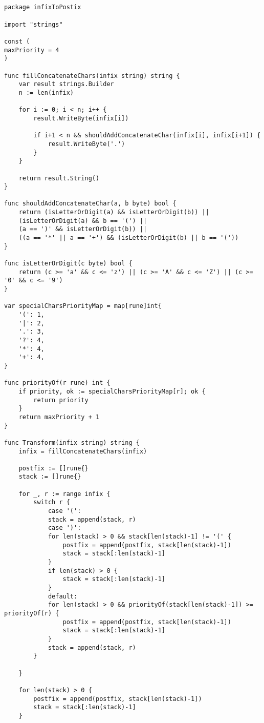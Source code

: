 \begin{appendices}
	\chapter{}\label{app1}
	\begin{lstlisting}[caption=Модуль infixToPostfix, extendedchars=\true]
package infixToPostix

import "strings"

const (
maxPriority = 4
)

func fillConcatenateChars(infix string) string {
	var result strings.Builder
	n := len(infix)
	
	for i := 0; i < n; i++ {
		result.WriteByte(infix[i])
		
		if i+1 < n && shouldAddConcatenateChar(infix[i], infix[i+1]) {
			result.WriteByte('.')
		}
	}
	
	return result.String()
}

func shouldAddConcatenateChar(a, b byte) bool {
	return (isLetterOrDigit(a) && isLetterOrDigit(b)) ||
	(isLetterOrDigit(a) && b == '(') ||
	(a == ')' && isLetterOrDigit(b)) ||
	((a == '*' || a == '+') && (isLetterOrDigit(b) || b == '('))
}

func isLetterOrDigit(c byte) bool {
	return (c >= 'a' && c <= 'z') || (c >= 'A' && c <= 'Z') || (c >= '0' && c <= '9')
}

var specialCharsPriorityMap = map[rune]int{
	'(': 1,
	'|': 2,
	'.': 3,
	'?': 4,
	'*': 4,
	'+': 4,
}

func priorityOf(r rune) int {
	if priority, ok := specialCharsPriorityMap[r]; ok {
		return priority
	}
	return maxPriority + 1
}

func Transform(infix string) string {
	infix = fillConcatenateChars(infix)
	
	postfix := []rune{}
	stack := []rune{}
	
	for _, r := range infix {
		switch r {
			case '(':
			stack = append(stack, r)
			case ')':
			for len(stack) > 0 && stack[len(stack)-1] != '(' {
				postfix = append(postfix, stack[len(stack)-1])
				stack = stack[:len(stack)-1]
			}
			if len(stack) > 0 {
				stack = stack[:len(stack)-1]
			}
			default:
			for len(stack) > 0 && priorityOf(stack[len(stack)-1]) >= priorityOf(r) {
				postfix = append(postfix, stack[len(stack)-1])
				stack = stack[:len(stack)-1]
			}
			stack = append(stack, r)
		}
		
	}
	
	for len(stack) > 0 {
		postfix = append(postfix, stack[len(stack)-1])
		stack = stack[:len(stack)-1]
	}
	

\end{lstlisting}
\end{appendices}
